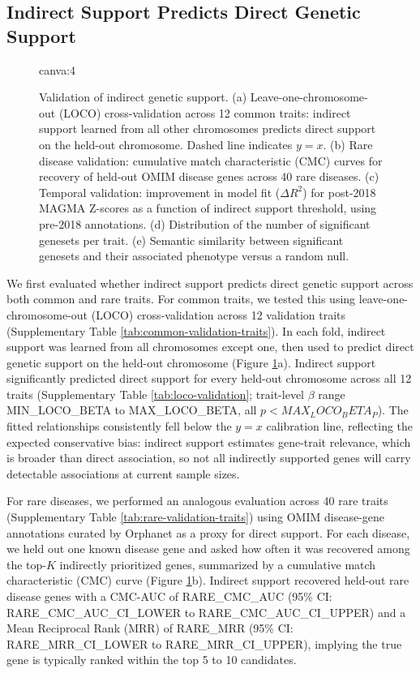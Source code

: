 \subsection{Indirect Support Predicts Direct Genetic Support}

\begin{figure}[t!]
    \centering
    {{canva:4}}
    \caption{Validation of indirect genetic support. (a) Leave-one-chromosome-out (LOCO) cross-validation across 12 common traits: indirect support learned from all other chromosomes predicts direct support on the held-out chromosome. Dashed line indicates $y = x$. (b) Rare disease validation: cumulative match characteristic (CMC) curves for recovery of held-out OMIM disease genes across 40 rare diseases. (c) Temporal validation: improvement in model fit ($\Delta R^2$) for post-2018 MAGMA Z-scores as a function of indirect support threshold, using pre-2018 annotations. (d) Distribution of the number of significant genesets per trait. (e) Semantic similarity between significant genesets and their associated phenotype versus a random null.}
    \label{fig:validation-genetics}
\end{figure}

We first evaluated whether indirect support predicts direct genetic support across both common and rare traits. For common traits, we tested this using leave-one-chromosome-out (LOCO) cross-validation across 12 validation traits (Supplementary Table \ref{tab:common-validation-traits}). In each fold, indirect support was learned from all chromosomes except one, then used to predict direct genetic support on the held-out chromosome (Figure \ref{fig:validation-genetics}a). Indirect support significantly predicted direct support for every held-out chromosome across all 12 traits (Supplementary Table \ref{tab:loco-validation}; trait-level $\beta$ range {{MIN_LOCO_BETA}} to {{MAX_LOCO_BETA}}, all $p < {{MAX_LOCO_BETA_P}}$). The fitted relationships consistently fell below the $y = x$ calibration line, reflecting the expected conservative bias: indirect support estimates gene-trait relevance, which is broader than direct association, so not all indirectly supported genes will carry detectable associations at current sample sizes.

For rare diseases, we performed an analogous evaluation across 40 rare traits (Supplementary Table \ref{tab:rare-validation-traits}) using OMIM disease-gene annotations curated by Orphanet as a proxy for direct support. For each disease, we held out one known disease gene and asked how often it was recovered among the top-$K$ indirectly prioritized genes, summarized by a cumulative match characteristic (CMC) curve (Figure \ref{fig:validation-genetics}b). Indirect support recovered held-out rare disease genes with a CMC-AUC of {{RARE_CMC_AUC}} (95\% CI: {{RARE_CMC_AUC_CI_LOWER}} to {{RARE_CMC_AUC_CI_UPPER}}) and a Mean Reciprocal Rank (MRR) of {{RARE_MRR}} (95\% CI: {{RARE_MRR_CI_LOWER}} to {{RARE_MRR_CI_UPPER}}), implying the true gene is typically ranked within the top 5 to 10 candidates.

